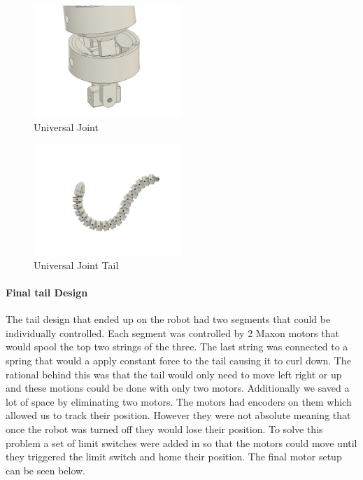         \begin{figure}[H]
                \centering
                \includegraphics[width=0.5\textwidth]{figures/UniversalJoint.png}
                \caption{Universal Joint}
                \label{fig:UniversalJoint}
        \end{figure}                
            
        \begin{figure}[H]
                \centering
                \includegraphics[width=0.5\textwidth]{figures/ContinuumTail.png}
                \caption{Universal Joint Tail}
                \label{fig:UniversalJointTail}
        \end{figure}    
        
        \paragraph{Final tail Design}
        The tail design that ended up on the robot had two segments that could be individually controlled. Each segment was controlled by 2 Maxon motors that would spool the top two strings of the three. The last string was connected to a spring that would a apply constant force to the tail causing it to curl down. The rational behind this was that the tail would only need to move left right or up and these motions could be done with only two motors. Additionally we saved a lot of space by eliminating two motors. The motors had encoders on them which allowed us to track their position. However they were not absolute meaning that once the robot was turned off they would lose their position. To solve this problem a set of limit switches were added in so that the motors could move until they triggered the limit switch and home their position. The final motor setup can be seen below.
        
